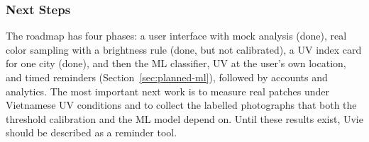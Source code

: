 \subsubsection{Next Steps}
The roadmap has four phases: a user interface with mock analysis (done), real color sampling with a
brightness rule (done, but not calibrated), a UV index card for one city (done), and then the ML
classifier, UV at the user's own location, and timed reminders (Section~\ref{sec:planned-ml}),
followed by accounts and analytics. The most important next work is to measure real patches under
Vietnamese UV conditions and to collect the labelled photographs that both the threshold calibration
and the ML model depend on. Until these results exist, Uvie should be described as a reminder tool.
